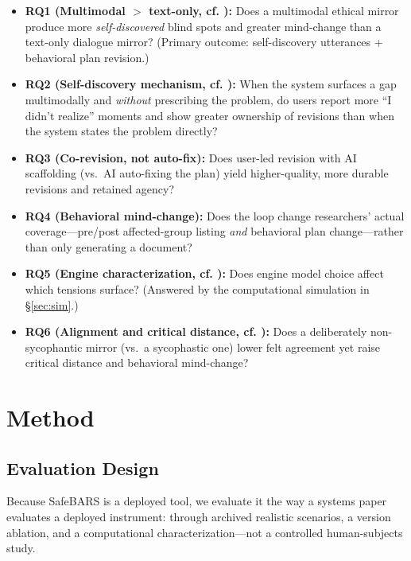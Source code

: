 \documentclass[sigconf,screen]{acmart}
\begin{document}
\begin{itemize}
  \item \textbf{RQ1 (Multimodal $>$ text-only, cf. \citeauthor{taheri26}):} Does
    a multimodal ethical mirror produce more \emph{self-discovered} blind spots
    and greater mind-change than a text-only dialogue mirror? (Primary outcome:
    self-discovery utterances + behavioral plan revision.)
  \item \textbf{RQ2 (Self-discovery mechanism, cf. \citeauthor{taheri26}):} When
    the system surfaces a gap multimodally and \emph{without} prescribing the
    problem, do users report more ``I didn't realize'' moments and show greater
    ownership of revisions than when the system states the problem directly?
  \item \textbf{RQ3 (Co-revision, not auto-fix):} Does user-led revision with
    AI scaffolding (vs.~AI auto-fixing the plan) yield higher-quality, more
    durable revisions and retained agency?
  \item \textbf{RQ4 (Behavioral mind-change):} Does the loop change researchers'
    actual coverage---pre/post affected-group listing \emph{and} behavioral plan
    change---rather than only generating a document?
  \item \textbf{RQ5 (Engine characterization, cf. \citeauthor{perspectra26}):}
    Does engine model choice affect which tensions surface? (Answered by the
    computational simulation in \S\ref{sec:sim}.)
  \item \textbf{RQ6 (Alignment and critical distance, cf. \citeauthor{vibecheck26}):}
    Does a deliberately non-sycophantic mirror (vs.~a sycophastic one) lower felt
    agreement yet raise critical distance and behavioral mind-change?
\end{itemize}

\section{Method}

\subsection{Evaluation Design}
\label{sec:evaldesign}

Because SafeBARS is a deployed tool, we evaluate it the way a systems paper
evaluates a deployed instrument: through archived realistic scenarios, a
version ablation, and a computational characterization---not a controlled
human-subjects study.
\end{document}
